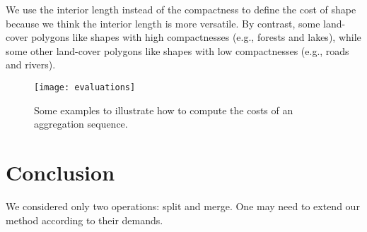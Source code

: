 \documentclass[ijgi,article,submit,moreauthors,pdftex]{Definitions/mdpi}
\begin{document}
We use the interior length instead of the compactness to define the cost of shape
because we think the interior length is more versatile.
By contrast, some land-cover polygons like shapes with high compactnesses 
(e.g., forests and lakes),
while some other land-cover polygons like shapes with low compactnesses 
(e.g., roads and rivers).


\begin{figure*}[tb]
\centering
\texttt{[image: evaluations]}
\caption{Some examples to illustrate how to compute the costs of an aggregation sequence.
}
\label{fig:evaluations}
\end{figure*}



\section{Conclusion}
We considered only two operations: split and merge.
One may need to extend our method according to their demands.









































\end{document}
